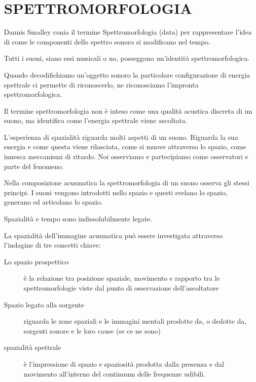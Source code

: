 
\chapter{SPETTROMORFOLOGIA}
\startcontents[chapters]


Dannis Smalley conia il termine Spettromorfologia (data) per rappresentare l'idea di come le
componenti dello spettro sonoro si modificano nel tempo.

Tutti i suoni, siano essi musicali o no, posseggono un'identità spettromorfologica.

Quando decodifichiamo un'oggetto sonoro la particolare configurazione di energia spettrale
ci permette di riconoscerlo, ne riconosciamo l'impronta spettromorfologica.

Il termine spettromorfologia non è inteso come una qualità acustica discreta di un suono,
ma identifica come l'energia spettrale viene ascoltata.

L'esperienza di spazialità riguarda molti aspetti di un suono. Riguarda la sua energia e come questa viene rilasciata, come si muove attraverso lo spazio, come innesca meccanismi di ritardo. Noi osserviamo e partecipiamo come osservatori e parte del fenomeno.

Nella composizione acusmatica la spettromorfologia di un suono osserva gli stessi principi. I suoni vengono introdotti nello spazio e questi svelano lo spazio, generano ed articolano lo spazio.

Spazialità e tempo sono indissolubilmente legate.

La spazialità dell'immagine acusmatica può essere investigata attraverso l'indagine di tre concetti chiave:

\begin{description}
  \item[Lo spazio prospettico] è la relazione tra posizione spaziale, movimento e rapporto tra le spettromorfologie viste dal punto di osservazione dell'ascoltatore
  \item[Spazio legato alla sorgente] riguarda le zone spaziali e le immagini mentali prodotte da, o dedotte da, sorgenti sonore e le loro cause (se ce ne sono)
  \item[spazialità spettrale]è l'impressione di spazio e spaziosità prodotta dalla presenza e dal movimento all'interno del continuum delle frequenze udibili.
  \end{description}

